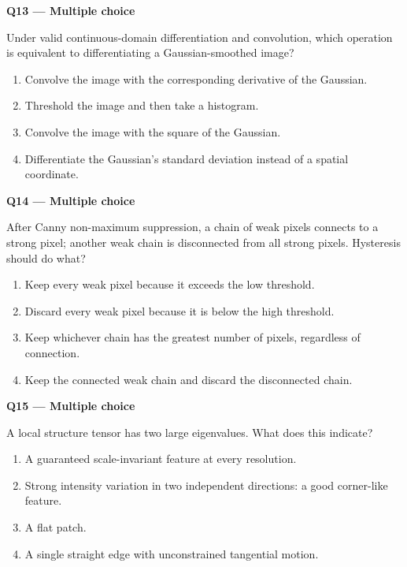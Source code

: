 \documentclass[11pt,a4paper]{article}
\begin{document}
\par\vspace{12pt}
\begin{minipage}{\linewidth}
\textbf{Q13 — Multiple choice}\par\smallskip
Under valid continuous-domain differentiation and convolution,\allowbreak{} which operation is equivalent to differentiating a Gaussian-smoothed image?
\begin{enumerate}[label=\textbf{\Alph*.}]
\item Convolve the image with the corresponding derivative of the Gaussian.
\item Threshold the image and then take a histogram.
\item Convolve the image with the square of the Gaussian.
\item Differentiate the Gaussian's standard deviation instead of a spatial coordinate.
\end{enumerate}
\end{minipage}
\par\vspace{12pt}
\begin{minipage}{\linewidth}
\textbf{Q14 — Multiple choice}\par\smallskip
After Canny non-maximum suppression,\allowbreak{} a chain of weak pixels connects to a strong pixel; another weak chain is disconnected from all strong pixels. Hysteresis should do what?
\begin{enumerate}[label=\textbf{\Alph*.}]
\item Keep every weak pixel because it exceeds the low threshold.
\item Discard every weak pixel because it is below the high threshold.
\item Keep whichever chain has the greatest number of pixels,\allowbreak{} regardless of connection.
\item Keep the connected weak chain and discard the disconnected chain.
\end{enumerate}
\end{minipage}
\par\vspace{12pt}
\begin{minipage}{\linewidth}
\textbf{Q15 — Multiple choice}\par\smallskip
A local structure tensor has two large eigenvalues. What does this indicate?
\begin{enumerate}[label=\textbf{\Alph*.}]
\item A guaranteed scale-invariant feature at every resolution.
\item Strong intensity variation in two independent directions: a good corner-like feature.
\item A flat patch.
\item A single straight edge with unconstrained tangential motion.
\end{enumerate}
\end{minipage}
\end{document}
